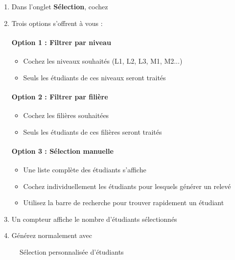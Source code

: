 \begin{enumerate}[leftmargin=*]
    \item Dans l'onglet \textbf{Sélection}, cochez 
    \item Trois options s'offrent à vous :

    \paragraph{Option 1 : Filtrer par niveau}
    \begin{itemize}
        \item Cochez les niveaux souhaités (L1, L2, L3, M1, M2...)
        \item Seuls les étudiants de ces niveaux seront traités
    \end{itemize}

    \paragraph{Option 2 : Filtrer par filière}
    \begin{itemize}
        \item Cochez les filières souhaitées
        \item Seuls les étudiants de ces filières seront traités
    \end{itemize}

    \paragraph{Option 3 : Sélection manuelle}
    \begin{itemize}
        \item Une liste complète des étudiants s'affiche
        \item Cochez individuellement les étudiants pour lesquels générer un relevé
        \item Utilisez la barre de recherche pour trouver rapidement un étudiant
    \end{itemize}

    \item Un compteur affiche le nombre d'étudiants sélectionnés
    \item Générez normalement avec 
\end{enumerate}

\begin{figure}[h]
    \centering
    \caption{Sélection personnalisée d'étudiants}
\end{figure}

